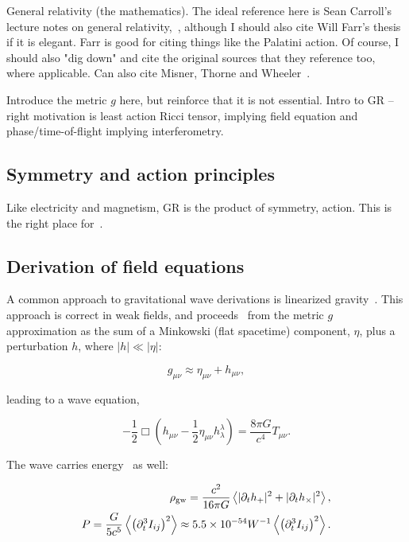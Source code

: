         General relativity (the mathematics). The ideal reference here is Sean Carroll's lecture notes on general relativity,~\cite{Carroll1997}, although I should also cite Will Farr's thesis~\cite{FarrThesis} if it is elegant. Farr is good for citing things like the Palatini action. Of course, I should also "dig down" and cite the original sources that they reference too, where applicable. Can also cite Misner, Thorne and Wheeler~\cite{MisnerThorneWheeler}.

            Introduce the metric $g$ here, but reinforce that it is not essential.
Intro to GR -- right motivation is least action Ricci tensor, implying field equation and phase/time-of-flight implying interferometry.

        \subsection{Symmetry and action principles}
        \label{principles}

            Like electricity and magnetism, GR is the product of symmetry, action. This is the right place for~\cite{Carroll1997}.


        \subsection{Derivation of field equations}
        \label{field_equations}

            A common approach to gravitational wave derivations is linearized gravity~\cite{FlanaganHughes2005}.
            This approach is correct in weak fields, and proceeds~\cite{AdhikariThesis} from the metric $g$ approximation as the sum of a Minkowski (flat spacetime) component, $\eta$, plus a perturbation $h$, where $|h| \ll |\eta|$:

\begin{equation}
g_{\mu \nu} \approx \eta_{\mu \nu} + h_{\mu \nu},
\end{equation}

\noindent leading to a wave equation,

\begin{equation}
-\frac{1}{2} \Box \left(h_{\mu \nu} - \frac{1}{2} \eta_{\mu \nu} h_{\lambda}^{\lambda} \right) = \frac{8 \pi G}{c^4} T_{\mu \nu}.
\end{equation}

The wave carries energy~\cite{BallmerThesis} as well:

\begin{eqnarray}
\rho_{\textup{gw}} = \frac{c^2}{16 \pi G} \left\langle |\partial_t h_+|^2 + |\partial_t h_\times|^2 \right\rangle,\\
P = \frac{G}{5c^5}\left\langle \left( \partial_t^3 I_{ij}\right)^2  \right\rangle \approx 5.5\times 10^{-54} W^{-1} \left\langle \left( \partial_t^3 I_{ij}\right)^2  \right\rangle.
\end{eqnarray}

